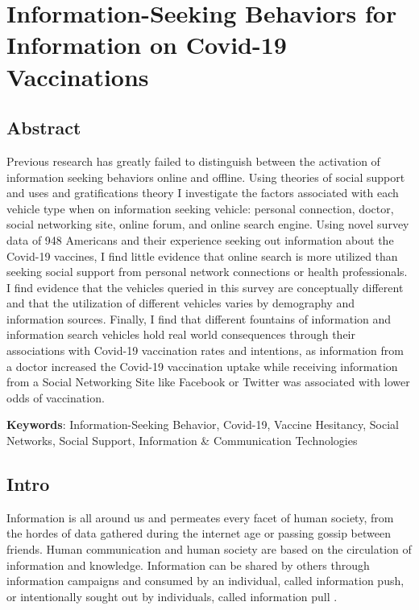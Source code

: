 \hypertarget{paper-2}{%
\chapter{Information-Seeking Behaviors for Information on Covid-19 Vaccinations}\label{paper-2}}

\hypertarget{abstract}{%
\section{Abstract}\label{abstract}}

Previous research has greatly failed to distinguish between the activation of
information seeking behaviors online and offline. Using theories of social
support and uses and gratifications theory I investigate the factors associated
with each vehicle type when on information seeking vehicle: personal connection,
doctor, social networking site, online forum, and online search engine. Using
novel survey data of 948 Americans and their experience seeking out
information about the Covid-19 vaccines, I find little evidence that online
search is more utilized than seeking social support from personal network
connections or health professionals. I find evidence that the vehicles queried
in this survey are conceptually different and that the utilization of different
vehicles varies by demography and information sources. Finally, I find that
different fountains of information and information search vehicles hold real
world consequences through their associations with Covid-19 vaccination rates
and intentions, as information from a doctor increased the Covid-19 vaccination
uptake while receiving information from a Social Networking Site like Facebook
or Twitter was associated with lower odds of vaccination.

\textbf{Keywords}: Information-Seeking Behavior, Covid-19, Vaccine Hesitancy, Social Networks, Social Support, Information \& Communication Technologies

\hypertarget{intro-1}{%
\section{Intro}\label{intro-1}}

Information is all around us and permeates every facet of human society, from
the hordes of data gathered during the internet age or passing gossip between
friends. Human communication and human society are based on the circulation of
information and knowledge. Information can be shared by others through
information campaigns and consumed by an individual, called information push, or
intentionally sought out by individuals, called information pull
\citep{cybenkoFoundationsInformationPush1999}.

